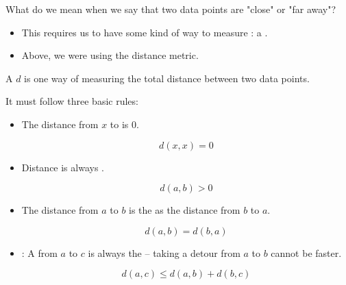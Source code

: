         What do we mean when we say that two data points are "close" or "far away"? 

        \begin{itemize}
            \item This requires us to have some kind of way to measure : a .

            \item Above, we were using the  distance metric.\\
        \end{itemize}

        \begin{definition}
            A  $d$ is one way of measuring the total distance between two data points.

            It must follow three basic rules:

            \begin{itemize}
                \item The distance from $x$ to  is 0.

                \begin{equation*}
                    d(x,x) = 0
                \end{equation*}

                \item Distance is always .

                \begin{equation*}
                    d(a,b)>0
                \end{equation*}

                \item The distance from $a$ to $b$ is the  as the distance from $b$ to $a$.

                \begin{equation*}
                    d(a,b)=d(b,a)
                \end{equation*}

                \item {}: A  from $a$ to $c$ is always the  -- taking a detour from $a$ to $b$ cannot be faster.

                \begin{equation*}
                    d(a,c) \leq d(a,b) + d(b,c)
                \end{equation*}
            \end{itemize}

            
        \end{definition}

